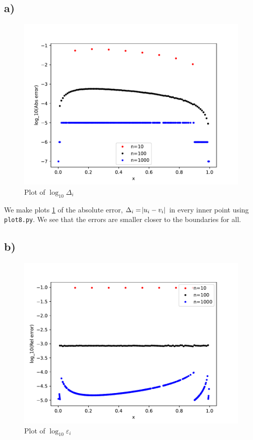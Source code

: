 \documentclass[a4paper,10pt,english]{article}
\begin{document}
			\subsection{a)}
			\begin{figure}[H]
				\centering
				\includegraphics[width=1.0\linewidth]{figures/plot_8a.pdf}
				\caption{Plot of $\log_{10}{\Delta_i}$}
				\label{fig_plot8a}
			\end{figure}
			
			
			We make plots \ref{fig_plot8a} of the absolute error, $\Delta_i = \abs{u_i - v_i}$ in every inner point using
			\verb|plot8.py|. We see that the errors are smaller closer to the boundaries for all.
			
			\subsection{b)}
			\begin{figure}[H]
				\centering
				\includegraphics[width=1.0\linewidth]{figures/plot_8b.pdf}
				\caption{Plot of $\log_{10}{\varepsilon_i}$}
				\label{fig_plot8b}
			\end{figure}
			
\end{document}
